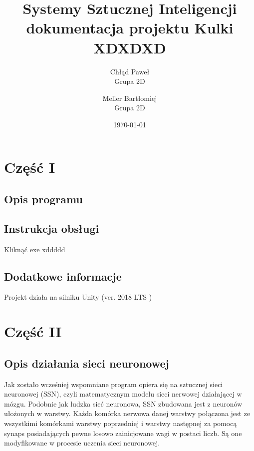 \documentclass[12pt,a4paper]{article}
\begin{document}
\title{Systemy Sztucznej Inteligencji\\\small{dokumentacja projektu Kulki XDXDXD}}
\author{
    Chłąd Paweł\\
    Grupa 2D
    \and
    Meller Bartłomiej\\
    Grupa 2D}
\date{\today}

\maketitle
\newpage
\section*{Część I}
\subsection*{Opis programu}

\subsection*{Instrukcja obsługi}
Kliknąć exe xddddd





\subsection*{Dodatkowe informacje}
Projekt działa na silniku Unity (ver. 2018 LTS )
\newpage
\section*{Część II}


\subsection*{Opis działania sieci neuronowej}

\hspace{20pt} Jak zostało wcześniej wspomniane program opiera się na sztucznej sieci neuronowej (SSN), czyli matematycznym modelu sieci nerwowej działającej w mózgu. Podobnie jak ludzka sieć neuronowa, SSN zbudowana jest z neuronów ułożonych w warstwy. Każda komórka nerwowa danej warstwy połączona jest ze wszystkimi komórkami warstwy poprzedniej i warstwy następnej za pomocą synaps posiadających pewne losowo zainicjowane wagi w postaci liczb. Są one modyfikowane w procesie uczenia sieci neuronowej.
\end{document}
